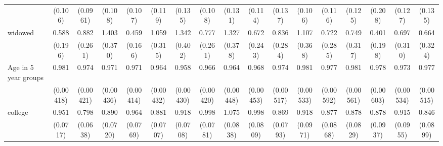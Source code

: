 {\begin{tabular}{l*{16}{c}}
                    &     (0.106)         &    (0.0961)         &     (0.108)         &     (0.107)         &     (0.119)         &     (0.135)         &     (0.108)         &     (0.131)         &     (0.114)         &     (0.137)         &     (0.106)         &     (0.116)         &     (0.125)         &     (0.208)         &     (0.127)         &     (0.135)         \\
[1em]
widowed             &       0.588         &       0.882         &       1.403         &       0.459\sym{*}  &       1.059         &       1.342         &       0.777         &       1.327         &       0.672         &       0.836         &       1.107         &       0.722         &       0.749         &       0.401         &       0.697         &       0.664         \\
                    &     (0.196)         &     (0.261)         &     (0.370)         &     (0.166)         &     (0.315)         &     (0.402)         &     (0.261)         &     (0.378)         &     (0.243)         &     (0.284)         &     (0.368)         &     (0.285)         &     (0.317)         &     (0.198)         &     (0.310)         &     (0.324)         \\
[1em]
Age in 5 year groups&       0.981\sym{***}&       0.974\sym{***}&       0.971\sym{***}&       0.971\sym{***}&       0.964\sym{***}&       0.958\sym{***}&       0.966\sym{***}&       0.964\sym{***}&       0.968\sym{***}&       0.974\sym{***}&       0.981\sym{***}&       0.977\sym{***}&       0.981\sym{***}&       0.978\sym{***}&       0.973\sym{***}&       0.977\sym{***}\\
                    &   (0.00418)         &   (0.00421)         &   (0.00436)         &   (0.00414)         &   (0.00432)         &   (0.00430)         &   (0.00420)         &   (0.00448)         &   (0.00453)         &   (0.00517)         &   (0.00533)         &   (0.00592)         &   (0.00561)         &   (0.00603)         &   (0.00534)         &   (0.00515)         \\
[1em]
college             &       0.951         &       0.798\sym{**} &       0.890         &       0.964         &       0.881         &       0.918         &       0.998         &       1.075         &       0.998         &       0.869         &       0.918         &       0.877         &       0.878         &       0.878         &       0.915         &       0.846         \\
                    &    (0.0717)         &    (0.0638)         &    (0.0720)         &    (0.0769)         &    (0.0707)         &    (0.0708)         &    (0.0781)         &    (0.0838)         &    (0.0809)         &    (0.0793)         &    (0.0971)         &    (0.0868)         &    (0.0829)         &    (0.0937)         &    (0.0955)         &    (0.0899)         \\

\end{tabular}}
